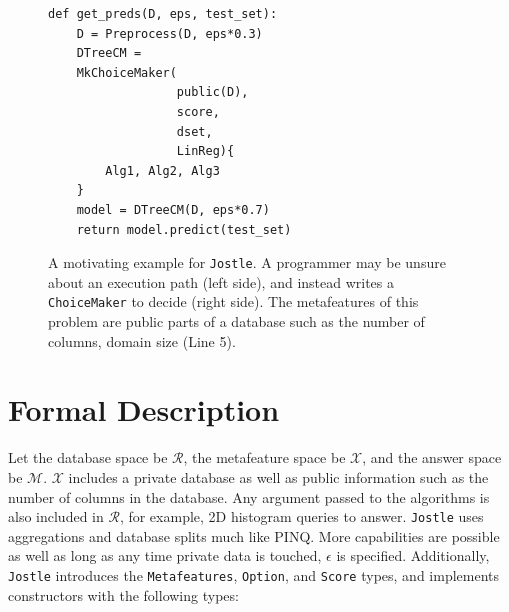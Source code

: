 \documentclass[11pt]{report}
\newcommand{\Jostle}{\texttt{Jostle}}
\renewcommand{\t}[1]{\texttt{#1}}
\begin{document}
\begin{figure}
\begin{minipage}{0.5\textwidth}
\begin{center}
\end{center}
\end{minipage}
\begin{minipage}{0.5\textwidth}
\begin{lstlisting}[style=MyPythonStyle]
def get_preds(D, eps, test_set):
    D = Preprocess(D, eps*0.3)
    DTreeCM = 
    MkChoiceMaker(
                  public(D),
                  score,
                  dset, 
                  LinReg){
        Alg1, Alg2, Alg3
    }
    model = DTreeCM(D, eps*0.7)
    return model.predict(test_set)
\end{lstlisting}
\end{minipage}
\caption{A motivating example for \Jostle{}. A programmer may be unsure about an execution path (left side), and instead writes a \t{ChoiceMaker} to decide (right side). The metafeatures of this problem are public parts of a database such as the number of columns, domain size (Line 5).}\label{fig:dtree_choices}
\end{figure}
\section{Formal Description}
Let the database space be $\mathcal{R}$, the metafeature space be $\mathcal{X}$, and the answer space be $\mathcal{M}$. $\mathcal{X}$ includes a private database as well as public information such as the number of columns in the database. Any argument passed to the algorithms is also included in $\mathcal{R}$, for example, 2D histogram queries to answer. \Jostle{} uses aggregations and database splits much like PINQ. More capabilities are possible as well as long as any time private data is touched, $\epsilon$ is specified. Additionally, \Jostle{} introduces the \t{Metafeatures}, \t{Option}, and \t{Score} types, and implements constructors with the following types:
\end{document}
